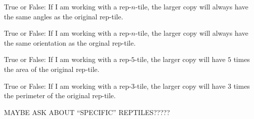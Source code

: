 \documentclass{ximera}
\author{Bart Snapp}
\begin{document}
\maketitle


\begin{exercise}
  True or False: If I am working with a rep-$n$-tile, the larger copy
  will always have the same angles as the original rep-tile.
\end{exercise}
\vfill

\begin{exercise}
  True or False: If I am working with a rep-$n$-tile, the larger copy
  will always have the same orientation as the orginal rep-tile.
\end{exercise}
\vfill

\begin{exercise}
  True or False: If I am working with a rep-$5$-tile, the larger copy
  will have $5$ times the area of the original rep-tile.
\end{exercise}
\vfill


\begin{exercise}
  True or False: If I am working with a rep-$3$-tile, the larger copy
  will have $3$ times the perimeter of the original rep-tile.
\end{exercise}
\vfill


\begin{exercise}
  MAYBE ASK ABOUT ``SPECIFIC'' REPTILES?????
\end{exercise}
\vfill


\begin{exercise}
  
\end{exercise}
\vfill

\begin{exercise}
  
\end{exercise}
\vfill



\end{document}
